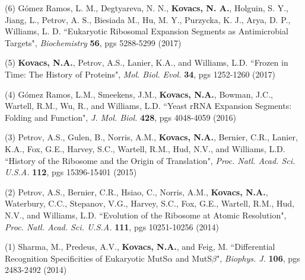 



\publication
{(6) G{\'o}mez Ramos, L. M., Degtyareva, N. N., {\bf Kovacs, N. A.}, Holguin, S. Y., Jiang, L., Petrov, A. S., Biesiada M., Hu, M. Y., Purzycka, K. J., Arya, D. P., Williams, L. D. ``Eukaryotic Ribosomal Expansion Segments as Antimicrobial Targets", \textit{Biochemistry} \textbf{56}, pgs 5288-5299 (2017) }


\publication
{(5) {\bf Kovacs, N.A.}, Petrov, A.S., Lanier, K.A., and Williams, L.D. ``Frozen in Time: The History of Proteins", \textit{Mol. Biol. Evol.} \textbf{34}, pgs 1252-1260 (2017)}


\publication
{(4) G{\'o}mez Ramos, L.M., Smeekens, J.M., {\bf Kovacs, N.A.}, Bowman, J.C., Wartell, R.M., Wu, R., and Williams, L.D. ``Yeast rRNA Expansion Segments: Folding and Function", \textit{J. Mol. Biol.} \textbf{428}, pgs 4048-4059 (2016)}


\publication
{(3) Petrov, A.S., Gulen, B., Norris, A.M., {\bf Kovacs, N.A.}, Bernier, C.R., Lanier, K.A., Fox, G.E., Harvey, S.C., Wartell, R.M., Hud, N.V., and Williams, L.D. ``History of the Ribosome and the Origin of Translation", \textit{Proc. Natl. Acad. Sci. U.S.A.} \textbf{112}, pgs 15396-15401 (2015)}


\publication
{(2) Petrov, A.S., Bernier, C.R., Hsiao, C., Norris, A.M., {\bf Kovacs, N.A.}, Waterbury, C.C., Stepanov, V.G., Harvey, S.C., Fox, G.E., Wartell, R.M., Hud, N.V., and Williams, L.D. ``Evolution of the Ribosome at Atomic Resolution", \textit{Proc. Natl. Acad. Sci. U.S.A.} \textbf{111}, pgs 10251-10256 (2014)}


\publication
{(1) Sharma, M., Predeus, A.V., {\bf Kovacs, N.A.}, and Feig, M. ``Differential Recognition Specificities of Eukaryotic MutS$\alpha$ and MutS$\beta$", \textit{Biophys. J.} \textbf{106}, pgs 2483-2492 (2014)}

